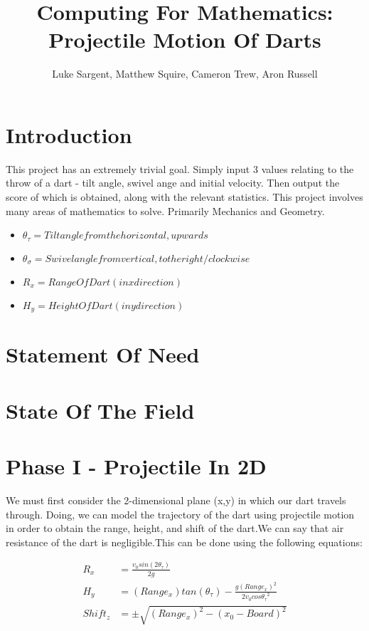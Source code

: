 \documentclass[a4paper]{article}
\title{Computing For Mathematics: Projectile Motion Of Darts}
\author{Luke Sargent, Matthew Squire, Cameron Trew, Aron Russell}
\begin{document}
\maketitle

\section{Introduction}
This project has an extremely trivial goal. Simply input 3 values relating to the throw of a dart
- tilt angle, swivel ange and initial velocity. Then output the score of which is obtained, along with the
relevant statistics. This project involves many areas of mathematics to solve.
Primarily Mechanics and Geometry.


\begin{itemize}\label{Glossary Of Terms}
    \item \(\theta_\tau = Tilt angle from the horizontal, upwards\)
    \item \(\theta_\sigma = Swivel angle from vertical, to the right/clockwise\)
    \item \(R_x = Range Of Dart (in x direction)\)
    \item \(H_y = Height Of Dart (in y direction)\)
\end{itemize}

\section{Statement Of Need}

\section{State Of The Field}

\section{Phase I - Projectile In 2D}
We must first consider the 2-dimensional plane (x,y) in which our dart
travels through. Doing, we can model the trajectory of the dart using projectile motion
in order to obtain the range, height, and shift of the dart.We can say that air resistance of the dart is negligible.This can be done using the following equations:

\begin{align}
    R_x & = \frac{v_0sin(2\theta_\tau)}{2g}\\
    H_y & = (Range_x)tan(\theta_\tau) - \frac{g(Range_x)^2}{2v_0cos{\theta_\tau}^2}\\
    Shift_z & = \pm\sqrt{(Range_x)^2 - (x_0 - Board)^2}
\end{align}
\end{document}
